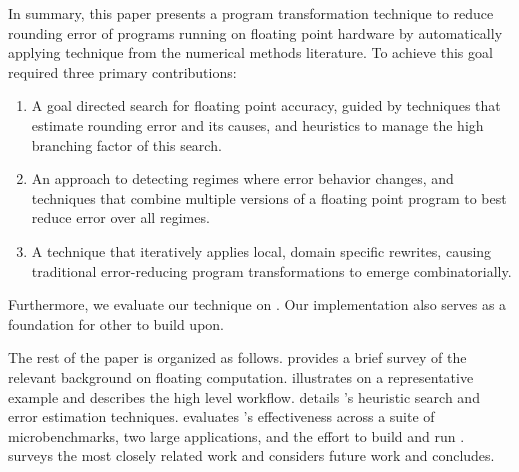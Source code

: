 \documentclass[paper.tex]{subfiles}
\begin{document}
In summary, this paper presents a program transformation technique to
reduce rounding error of programs running on floating point hardware
by automatically applying technique from the numerical methods
literature.  To achieve this goal required three primary
contributions:
\begin{enumerate}
\item A goal directed search for floating point accuracy, guided by
  techniques that estimate rounding error and its causes,
  and heuristics to manage the high branching factor of this search.
\item An approach to detecting regimes where error behavior changes,
  and techniques that combine multiple versions of a floating point
  program to best reduce error over all regimes.
\item A technique that iteratively applies local, domain specific rewrites,
  causing traditional error-reducing program transformations
  to emerge combinatorially.
\end{enumerate}
Furthermore, we evaluate our technique on .  Our implementation also serves as a foundation for
other to build upon.

The rest of the paper is organized as follows.  
provides a brief survey of the relevant background on floating
computation.   illustrates \casio on a
representative example and describes the high level \casio workflow.
 details \casio's heuristic search and error
estimation techniques.   evaluates \casio's
effectiveness across a suite of microbenchmarks, two large
applications, and the effort to build and run \casio.
 surveys the most closely related work and
 considers future work and concludes.






\end{document}
